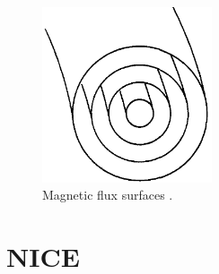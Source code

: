\begin{figure}
  \centering
  \includegraphics[width=5cm]{images/fluxsurf.png}
  \caption{Magnetic flux surfaces \cite{wessontokamak}.}
  \label{fig:magfluxsurf}
\end{figure}

\section{NICE}

